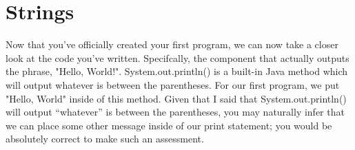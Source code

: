 

\chapter{Strings}


Now that you've officially created your first program, we can now take a closer look at the code you've written.
Specifcally, the component that actually outputs the phrase, "Hello, World!".
System.out.println() is a built-in Java method which will output whatever is between the parentheses.
For our first program, we put "Hello, World" inside of this method.
Given that I said that System.out.println() will output ``whatever'' is between the parentheses, you may naturally infer that we can place some other message inside of our print statement; you would be absolutely correct to make such an assessment.




